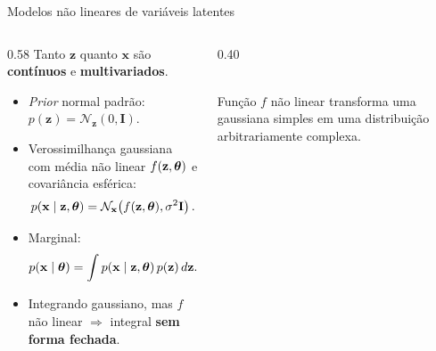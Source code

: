 \documentclass[aspectratio=169,xcolor=dvipsnames]{beamer}
\begin{document}
  \begin{frame}{Modelos não lineares de variáveis latentes}
    \begin{columns}[T]
      \begin{column}{0.58\textwidth}
        Tanto $\mathbf{z}$ quanto $\mathbf{x}$ são \textbf{contínuos} e
        \textbf{multivariados}.
        \begin{itemize}
          \item \textit{Prior} normal padrão:
          $p(\mathbf{z}) = \mathcal{N}_{\mathbf{z}}(0, \mathbf{I})$.
          \item Verossimilhança gaussiana com média não linear
          $f(\mathbf{z}, \bm{\theta})$ e covariância esférica:
          \[
            p(\mathbf{x} \mid \mathbf{z}, \bm{\theta}) = \mathcal{N}_{\mathbf{x}}\!\left(f(\mathbf{z}, \bm{\theta}), \sigma^{2}\mathbf{I}\right).
          \]
          \item Marginal:
          \[
            p(\mathbf{x} \mid \bm{\theta}) = \int p(\mathbf{x}\mid \mathbf{z},\bm{\theta})\, p(\mathbf{z})\, d\mathbf{z}.
          \]
          \item Integrando gaussiano, mas $f$ não linear $\Rightarrow$
          integral \textbf{sem forma fechada}.
        \end{itemize}
      \end{column}
      \begin{column}{0.40\textwidth}
        \centering
        \\
        \vspace{0.6em}
        \scriptsize Função $f$ não linear transforma uma gaussiana
        simples em uma distribuição arbitrariamente complexa.
      \end{column}
    \end{columns}
  \end{frame}
\end{document}
